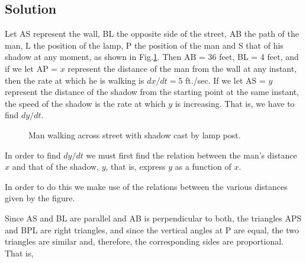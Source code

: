 \subsection*{Solution}
Let AS represent the wall, BL the opposite side of the street, AB the path of the man, L the position of the lamp, P the position of the man and S that of his shadow at any moment, as shown in Fig.\ref{fig:shadow}. Then AB = 36 feet, BL = 4 feet, and if we let AP = $x$ represent the distance of the man from the wall at any instant, then the rate at which he is walking is $dx/dt = 5$ ft./sec. If we let AS = $y$ represent the distance of the shadow from the starting point at the same instant, the speed of the shadow is the rate at which $y$ is increasing. That is, we have to find $dy/dt$.

\begin{figure}[h]
\centering
{}
\caption{Man walking across street with shadow cast by lamp post.}
\label{fig:shadow}
\end{figure}

In order to find $dy/dt$ we must first find the relation between the man's distance $x$ and that of the shadow, $y$, that is, express $y$ as a function of $x$.

In order to do this we make use of the relations between the various distances given by the figure.

Since AS and BL are parallel and AB is perpendicular to both, the triangles APS and BPL are right triangles, and since the vertical angles at P are equal, the two triangles are similar and, therefore, the corresponding sides are proportional. That is,

